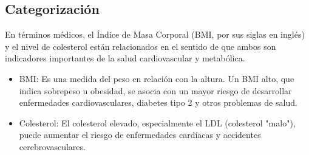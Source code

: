 \documentclass[10pt,journal,compsoc]{IEEEtran}
\begin{document}
\subsection{Categorización}
En términos médicos, el Índice de Masa Corporal (BMI, por sus siglas en inglés) y el nivel de colesterol están relacionados en el sentido de que ambos son indicadores importantes de la salud cardiovascular y metabólica.
\begin{itemize}
  \item BMI: Es una medida del peso en relación con la altura. Un BMI alto, que indica sobrepeso u obesidad, se asocia con un mayor riesgo de desarrollar enfermedades cardiovasculares, diabetes tipo 2 y otros problemas de salud.
  \item Colesterol: El colesterol elevado, especialmente el LDL (colesterol "malo"), puede aumentar el riesgo de enfermedades cardíacas y accidentes cerebrovasculares.


\end{itemize}
\end{document}
